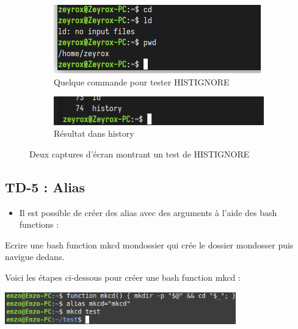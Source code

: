 \documentclass[12pt]{article}
\begin{document}
\begin{figure}[h]
  \centering
  \begin{subfigure}{0.45\textwidth}
    \centering
    \includegraphics[width=\textwidth]{Image-TD-4/commande_test.png}
    \caption{Quelque commande pour tester HISTIGNORE}
  \end{subfigure}
  \vspace{0.9cm} %
  \begin{subfigure}{0.45\textwidth}
    \centering
    \includegraphics[width=\textwidth]{Image-TD-4/history1.png}
    \caption{Résultat dans history}
  \end{subfigure}
  \caption{Deux captures d'écran montrant un test de HISTIGNORE}
\end{figure}

\subsection{TD-5 : Alias}

\begin{itemize}
  \item Il est possible de créer des alias avec des arguments à l'aide des bash functions : 
\end{itemize}

\vspace{0.3cm}

Ecrire une bash function mkcd mondossier qui crée le dossier mondosser puis navigue dedans. 

\vspace{0.3cm}

Voici les étapes ci-dessous pour créer une bash function mkcd : 

\vspace{0.3cm}

\begin{center}
  \includegraphics[width=10cm]{Image-TD-5/mkcd.png}
\end{center}
\end{document}
